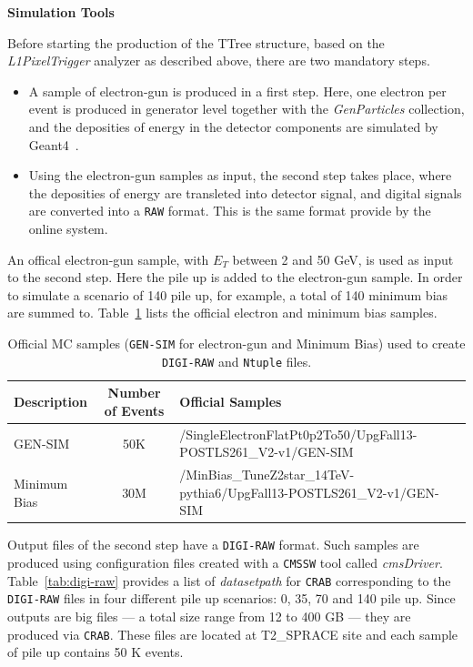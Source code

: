 \vspace{0.5 cm}
\textbf{Simulation Tools}

Before starting the production of the TTree structure, based on the \textit{L1PixelTrigger} analyzer as described
above, there are two mandatory steps.
\begin{itemize}
\item A sample of electron-gun is produced in a first step. Here, one electron per event is produced in generator
  level together with the {\it GenParticles} collection, and the deposities of energy in the detector components
  are simulated by Geant4~\cite{Agostinelli:2002hh}.
\item Using the electron-gun samples as input, the second step takes place, where the deposities of energy are
  transleted into detector signal, and digital signals are converted into a {\texttt{RAW}} format. This is the
  same format provide by the online system.
\end{itemize}

An offical electron-gun sample, with $E_{T}$ between 2 and 50 GeV, is used as input to the second step. Here the
pile up is added to the electron-gun sample. In order to simulate a scenario of 140 pile up, for example, a total of 140
minimum bias are summed to. Table~\ref{tab:gen-sim-minbias} lists the official electron and minimum bias samples.

\begin{table}[!htb]
  \centering
  \scriptsize
  \caption{Official MC samples (\texttt{GEN-SIM} for electron-gun and Minimum Bias) used to create
    \texttt{DIGI-RAW} and \texttt{Ntuple} files.}
  \label{tab:gen-sim-minbias}
  \begin{tabular}{lcl}
    \hline
        {\bf Description} & {\bf Number of Events} & {\bf Official Samples} \\ \hline \hline
        GEN-SIM           & 50K                    & /SingleElectronFlatPt0p2To50/UpgFall13-POSTLS261\_V2-v1/GEN-SIM \\ \hline
        Minimum Bias      & 30M                    & /MinBias\_TuneZ2star\_14TeV-pythia6/UpgFall13-POSTLS261\_V2-v1/GEN-SIM \\ \hline
  \end{tabular}
\end{table}

Output files of the second step have a \texttt{DIGI-RAW} format. Such samples are produced using configuration
files created with a \texttt{CMSSW} tool called {\it cmsDriver}. Table~\ref{tab:digi-raw} provides a list of
{\it datasetpath} for \texttt{CRAB} corresponding to the \texttt{DIGI-RAW} files in four different pile up
scenarios: 0, 35, 70 and 140 pile up. Since outputs are big files --- a total size range from 12 to 400 GB ---
they are produced via \texttt{CRAB}. These files are located at T2\_SPRACE site and each sample of pile up
contains 50 K events.

